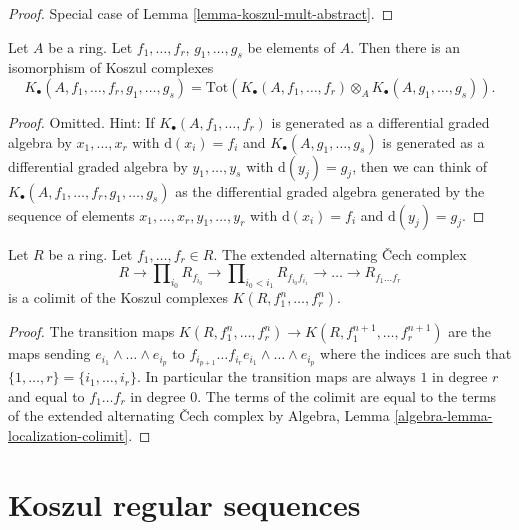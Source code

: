 \begin{proof}
Special case of
Lemma \ref{lemma-koszul-mult-abstract}.
\end{proof}

\begin{lemma}
\label{lemma-join-sequences-koszul-complex}
Let $A$ be a ring.
Let $f_1, \ldots, f_r$, $g_1, \ldots, g_s$ be elements of $A$.
Then there is an isomorphism of Koszul complexes
$$
K_\bullet(A, f_1, \ldots, f_r, g_1, \ldots, g_s) =
\text{Tot}(K_\bullet(A, f_1, \ldots, f_r) \otimes_A
K_\bullet(A, g_1, \ldots, g_s)).
$$
\end{lemma}

\begin{proof}
Omitted. Hint: If $K_\bullet(A, f_1, \ldots, f_r)$ is generated as a
differential graded algebra by $x_1, \ldots, x_r$ with $\text{d}(x_i) = f_i$
and $K_\bullet(A, g_1, \ldots, g_s)$ is generated as a
differential graded algebra by $y_1, \ldots, y_s$ with $\text{d}(y_j) = g_j$,
then we can think of $K_\bullet(A, f_1, \ldots, f_r, g_1, \ldots, g_s)$
as the differential graded algebra generated by the sequence of elements
$x_1, \ldots, x_r, y_1, \ldots, y_r$ with $\text{d}(x_i) = f_i$
and $\text{d}(y_j) = g_j$.
\end{proof}

\begin{lemma}
\label{lemma-extended-alternating-Cech-is-colimit-koszul}
Let $R$ be a ring. Let $f_1, \ldots, f_r \in R$.
The extended alternating {\v C}ech complex
$$
R \to \prod\nolimits_{i_0} R_{f_{i_0}} \to
\prod\nolimits_{i_0 < i_1} R_{f_{i_0}f_{i_1}} \to
\ldots \to R_{f_1\ldots f_r}
$$
is a colimit of the Koszul complexes $K(R, f_1^n, \ldots, f_r^n)$.
\end{lemma}

\begin{proof}
The transition maps $K(R, f_1^n, \ldots, f_r^n) \to
K(R, f_1^{n + 1}, \ldots, f_r^{n + 1})$ are the maps
sending $e_{i_1} \wedge \ldots \wedge e_{i_p}$ to
$f_{i_{p + 1}} \ldots f_{i_r} e_{i_1} \wedge \ldots \wedge e_{i_p}$
where the indices are such that $\{1, \ldots, r\} = \{i_1, \ldots, i_r\}$.
In particular the transition maps are always $1$ in degree $r$
and equal to $f_1\ldots f_r$ in degree $0$.
The terms of the colimit are equal to the terms of the
extended alternating {\v C}ech complex by
Algebra, Lemma \ref{algebra-lemma-localization-colimit}.
\end{proof}




\section{Koszul regular sequences}
\label{section-koszul-regular}


